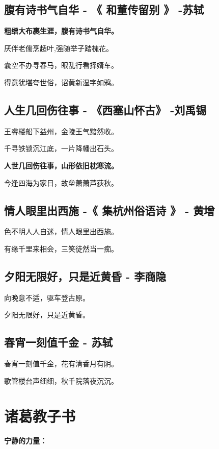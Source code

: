 \documentclass[UTF8,a4paper,8pt]{ctexbook}
\begin{document}
	\subsection{腹有诗书气自华 - 《 和董传留别 》   -苏轼   }
	
		\textbf{粗缯大布裹生涯，腹有诗书气自华。}
		
		厌伴老儒烹趏叶,强随举子踏槐花。
		
		囊空不办寻春马，眼乱行看择婿车。
		
		得意犹堪夸世俗，诏黄新湿字如鸦。
		
	\subsection{人生几回伤往事 - 《西塞山怀古》   -刘禹锡} 
	  
		王睿楼船下益州，金陵王气黯然收。
		
		千寻铁锁沉江底，一片降幡出石头。
		
		\textbf{人世几回伤往事，山形依旧枕寒流。}
		
		今逢四海为家日，故垒萧萧芦荻秋。
		
	\subsection{情人眼里出西施 -《 集杭州俗语诗 》  -   黄增  }
	
		色不明人人自迷，情人眼里出西施。
		
		有缘千里来相会，三笑徒然当一痴。
		
	\subsection{夕阳无限好，只是近黄昏  - 李商隐}
		
		向晚意不适，驱车登古原。
		
		夕阳无限好，只是近黄昏。
		
	\subsection{春宵一刻值千金 - 苏轼}
	
		春宵一刻值千金，花有清香月有阴。
		
		歌管楼台声细细，秋千院落夜沉沉。
		
\newpage 
\section{诸葛教子书}
	\paragraph{宁静的力量：}
	
\end{document}
